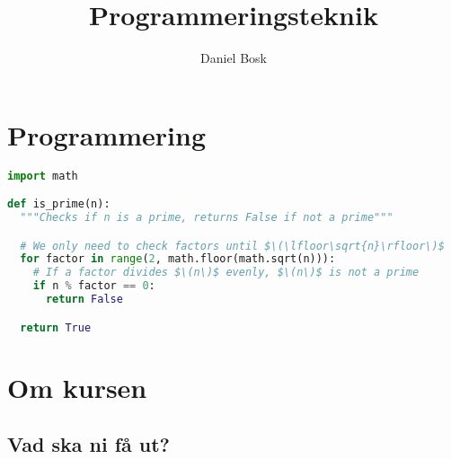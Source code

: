 \title{%
  Programmeringsteknik
}
\author{Daniel Bosk}


\mode*

\begin{abstract}
  
\end{abstract}


\section{Programmering}

\begin{frame}[fragile]
  \begin{lstlisting}[language=python]
import math

def is_prime(n):
  """Checks if n is a prime, returns False if not a prime"""

  # We only need to check factors until $\(\lfloor\sqrt{n}\rfloor\)$
  for factor in range(2, math.floor(math.sqrt(n))):
    # If a factor divides $\(n\)$ evenly, $\(n\)$ is not a prime
    if n % factor == 0:
      return False

  return True
  \end{lstlisting}
\end{frame}

\section{Om kursen}

\subsection{Vad ska ni få ut?}

